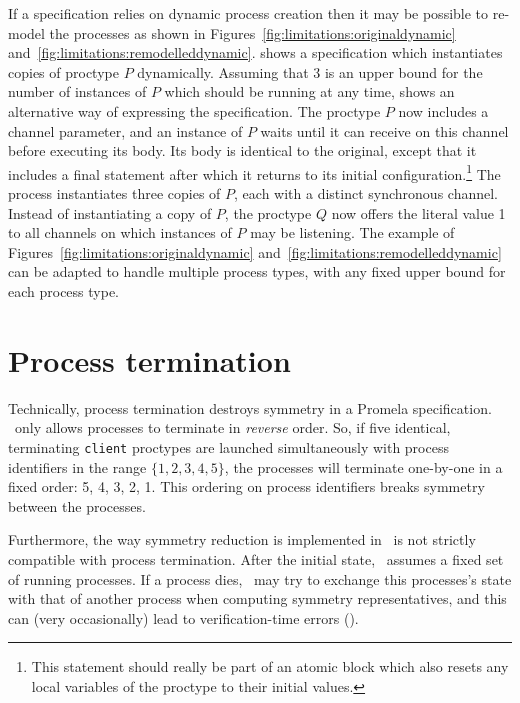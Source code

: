 If a specification relies on dynamic process
creation then it may be possible to re-model the processes as shown
in Figures~\ref{fig:limitations:originaldynamic}
and~\ref{fig:limitations:remodelleddynamic}.
 shows a
specification which instantiates copies of proctype $P$ dynamically.
Assuming that 3 is an upper bound for the number of instances of $P$
which should be running at any time,
 shows an
alternative way of expressing the specification.  The proctype $P$
now includes a channel parameter, and an instance of $P$ waits until
it can receive on this channel before executing its body.  Its body
is identical to the original, except that it includes a final
 statement after which it returns to its initial
configuration.\footnote{This  statement should really
be part of an atomic block which also resets any local variables of
the proctype to their initial values.}  The  process
instantiates three copies of $P$, each with a distinct synchronous
channel.  Instead of instantiating a copy of $P$, the proctype $Q$
now offers the literal value 1 to all channels on which instances of
$P$ may be listening.  The example of
Figures~\ref{fig:limitations:originaldynamic}
and~\ref{fig:limitations:remodelleddynamic} can be
adapted to handle multiple process types, with any fixed upper bound
for each process type.



\section{Process termination}\label{sec:limitations:termination}

Technically, process termination destroys symmetry in a Promela specification.  \spin\ only allows processes
to terminate in \emph{reverse} order.  So, if five identical, terminating \texttt{client} proctypes are launched simultaneously
with process identifiers in the range $\{1,2,3,4,5\}$, the processes will terminate one-by-one in a fixed order: 5, 4, 3, 2, 1.
This ordering on process identifiers breaks symmetry between the processes.

Furthermore, the way symmetry reduction is implemented in \topspin\ is not strictly compatible with process termination.  After the
initial state, \topspin\ assumes a fixed set of running processes.  If a process dies, \topspin\ may try to exchange this
processes's state with that of another process when computing symmetry representatives, and this can (very occasionally) lead
to verification-time errors ().

